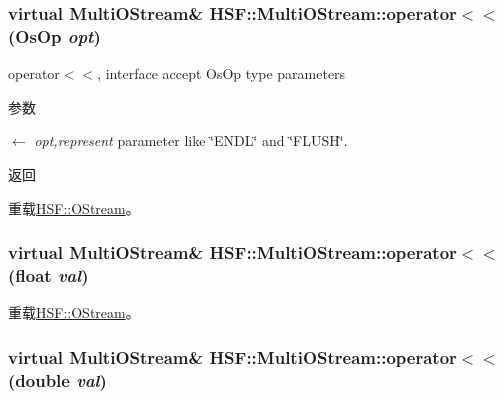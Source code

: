 \label{classHSF_1_1MultiOStream_a2a33520e221422d2a10e1c3eace3029b}
\hypertarget{classHSF_1_1MultiOStream_a31d1b48c4c7aac4ec51352f4dad28c8a}{
\subsubsection[{operator$<$$<$}]{\setlength{\rightskip}{0pt plus 5cm}virtual {\bf MultiOStream}\& HSF::MultiOStream::operator$<$$<$ ({\bf OsOp} {\em opt})}}
\label{classHSF_1_1MultiOStream_a31d1b48c4c7aac4ec51352f4dad28c8a}


operator$<$$<$, interface accept OsOp type parameters 
\begin{DoxyParams}{参数}
\item[\mbox{$\leftarrow$} {\em opt,represent}]parameter like \char`\"{}ENDL\char`\"{} and \char`\"{}FLUSH\char`\"{}. \end{DoxyParams}
\begin{DoxyReturn}{返回}

\end{DoxyReturn}


重载\hyperlink{classHSF_1_1OStream_aa7a6f8ac15aaa2145e23f92904350b39}{HSF::OStream}。\hypertarget{classHSF_1_1MultiOStream_ac926ea2605959066ab85c45a58dfa229}{
\subsubsection[{operator$<$$<$}]{\setlength{\rightskip}{0pt plus 5cm}virtual {\bf MultiOStream}\& HSF::MultiOStream::operator$<$$<$ (float {\em val})}}
\label{classHSF_1_1MultiOStream_ac926ea2605959066ab85c45a58dfa229}


重载\hyperlink{classHSF_1_1OStream_a26a658cc9ab9422d58252ef75a7ca360}{HSF::OStream}。\hypertarget{classHSF_1_1MultiOStream_a5655da107161e680d3ae6eadb35e6617}{
\subsubsection[{operator$<$$<$}]{\setlength{\rightskip}{0pt plus 5cm}virtual {\bf MultiOStream}\& HSF::MultiOStream::operator$<$$<$ (double {\em val})}}
\label{classHSF_1_1MultiOStream_a5655da107161e680d3ae6eadb35e6617}


